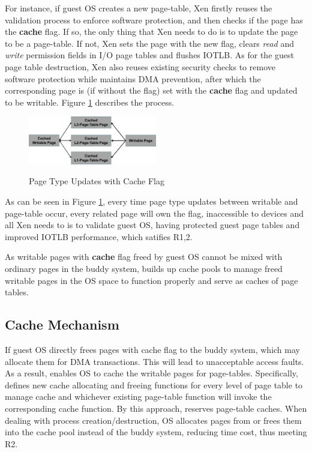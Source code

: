 For instance, if guest OS creates a new page-table, Xen firstly reuses the validation process to enforce software protection, and then checks if the page has the \textbf{cache} flag. If so, the only thing that Xen needs to do is to update the page to be a page-table. If not, Xen sets the page with the new flag, clears \emph{read} and \emph{write} permission fields in I/O page tables and flushes IOTLB. As for the guest page table destruction, Xen also reuses existing security checks to remove software protection while maintains DMA prevention, after which the corresponding page is (if without the flag) set with the \textbf{cache} flag and updated to be writable. Figure \ref{fig:cache-flag} describes the process.

\begin{figure}[ht]
\centering
\includegraphics[width=0.5\textwidth]{image/overview/page-type-updates-with-cache-flag.png} \\
\caption{Page Type Updates with Cache Flag}
\label{fig:cache-flag}
\end{figure}

As can be seen in Figure \ref{fig:cache-flag}, every time page type updates between writable and page-table occur, every related page will own the flag, inaccessible to devices and all Xen needs to is to validate guest OS, having protected guest page tables and improved IOTLB performance, which satifies R1,2.

As writable pages with \textbf{cache} flag freed by guest OS cannot be mixed with ordinary pages in the buddy system, \name builds up cache pools to manage freed writable pages in the OS space to function properly and serve as caches of page tables.

\subsection{Cache Mechanism}
If guest OS directly frees pages with cache flag to the buddy system, which may allocate them for DMA transactions. This will lead to unacceptable access faults. As a result, \name enables OS to cache the writable pages for page-tables. Specifically, \name defines new cache allocating and freeing functions for every level of page table to manage cache and whichever existing page-table function will invoke the corresponding cache function. By this approach, \name reserves page-table caches. When dealing with process creation/destruction, OS allocates pages from or frees them into the cache pool instead of the buddy system, reducing time cost, thus meeting R2.

